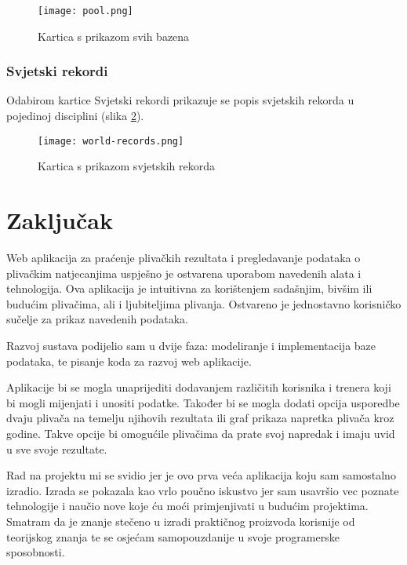 \documentclass[times, utf8, zavrsni]{fer}
\begin{document}
\begin{figure}[!h]
    \centering
    \texttt{[image: pool.png]}
    \centering
    \caption{Kartica s prikazom svih bazena}
    \label{fig:pool}
\end{figure}

\subsection{Svjetski rekordi}
Odabirom kartice Svjetski rekordi prikazuje se popis svjetskih rekorda u pojedinoj disciplini (slika \ref*{fig:world-records}).

\begin{figure}[!h]
    \centering
    \texttt{[image: world-records.png]}
    \centering
    \caption{Kartica s prikazom svjetskih rekorda}
    \label{fig:world-records}
\end{figure}

\chapter{Zaključak}
Web aplikacija za praćenje plivačkih rezultata i pregledavanje podataka o plivačkim natjecanjima uspješno je ostvarena
uporabom navedenih alata i tehnologija. Ova aplikacija je intuitivna za korištenjem sadašnjim, bivšim ili budućim
plivačima, ali i ljubiteljima plivanja. Ostvareno je jednostavno korisničko sučelje za prikaz navedenih podataka.

\vspace{\baselineskip}

Razvoj sustava podijelio sam u dvije faza: modeliranje i implementacija baze podataka, te pisanje koda za
razvoj web aplikacije. 

\vspace{\baselineskip}

Aplikacije bi se mogla unaprijediti dodavanjem različitih korisnika i trenera koji bi mogli mijenjati i unositi podatke.
Također bi se mogla dodati opcija usporedbe dvaju plivača na temelju njihovih rezultata ili graf prikaza napretka
plivača kroz godine. Takve opcije bi omogućile plivačima da prate svoj napredak i imaju uvid u sve svoje rezultate.

\vspace{\baselineskip}

Rad na projektu mi se svidio jer je ovo prva veća aplikacija koju sam samostalno izradio. Izrada se pokazala kao vrlo
poučno iskustvo jer sam usavršio vec poznate tehnologije i naučio nove koje ću moći primjenjivati u budućim projektima.
Smatram da je znanje stečeno u izradi praktičnog proizvoda korisnije od teorijskog znanja te se osjećam samopouzdanije u svoje
programerske sposobnosti. 
\end{document}
